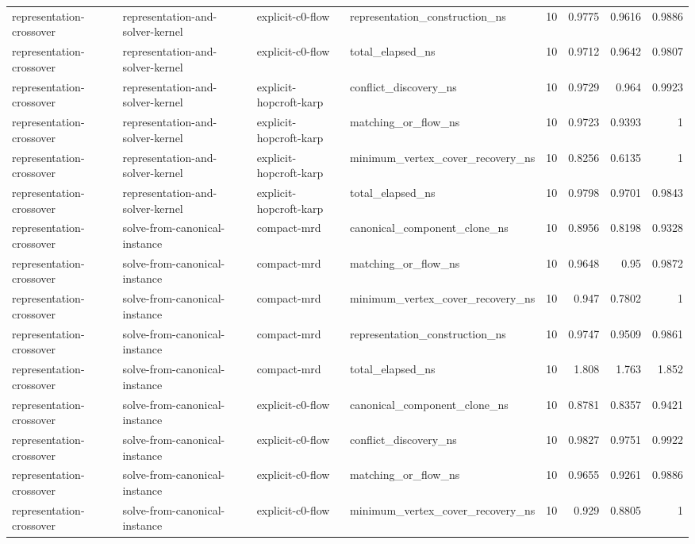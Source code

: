 \begin{table}[t]
\begin{tabular}{llllrrrr}
representation-crossover & representation-and-solver-kernel & explicit-c0-flow & representation\_construction\_ns & 10 & 0.9775 & 0.9616 & 0.9886 \\
representation-crossover & representation-and-solver-kernel & explicit-c0-flow & total\_elapsed\_ns & 10 & 0.9712 & 0.9642 & 0.9807 \\
representation-crossover & representation-and-solver-kernel & explicit-hopcroft-karp & conflict\_discovery\_ns & 10 & 0.9729 & 0.964 & 0.9923 \\
representation-crossover & representation-and-solver-kernel & explicit-hopcroft-karp & matching\_or\_flow\_ns & 10 & 0.9723 & 0.9393 & 1 \\
representation-crossover & representation-and-solver-kernel & explicit-hopcroft-karp & minimum\_vertex\_cover\_recovery\_ns & 10 & 0.8256 & 0.6135 & 1 \\
representation-crossover & representation-and-solver-kernel & explicit-hopcroft-karp & total\_elapsed\_ns & 10 & 0.9798 & 0.9701 & 0.9843 \\
representation-crossover & solve-from-canonical-instance & compact-mrd & canonical\_component\_clone\_ns & 10 & 0.8956 & 0.8198 & 0.9328 \\
representation-crossover & solve-from-canonical-instance & compact-mrd & matching\_or\_flow\_ns & 10 & 0.9648 & 0.95 & 0.9872 \\
representation-crossover & solve-from-canonical-instance & compact-mrd & minimum\_vertex\_cover\_recovery\_ns & 10 & 0.947 & 0.7802 & 1 \\
representation-crossover & solve-from-canonical-instance & compact-mrd & representation\_construction\_ns & 10 & 0.9747 & 0.9509 & 0.9861 \\
representation-crossover & solve-from-canonical-instance & compact-mrd & total\_elapsed\_ns & 10 & 1.808 & 1.763 & 1.852 \\
representation-crossover & solve-from-canonical-instance & explicit-c0-flow & canonical\_component\_clone\_ns & 10 & 0.8781 & 0.8357 & 0.9421 \\
representation-crossover & solve-from-canonical-instance & explicit-c0-flow & conflict\_discovery\_ns & 10 & 0.9827 & 0.9751 & 0.9922 \\
representation-crossover & solve-from-canonical-instance & explicit-c0-flow & matching\_or\_flow\_ns & 10 & 0.9655 & 0.9261 & 0.9886 \\
representation-crossover & solve-from-canonical-instance & explicit-c0-flow & minimum\_vertex\_cover\_recovery\_ns & 10 & 0.929 & 0.8805 & 1 \\

\end{tabular}
\end{table}
